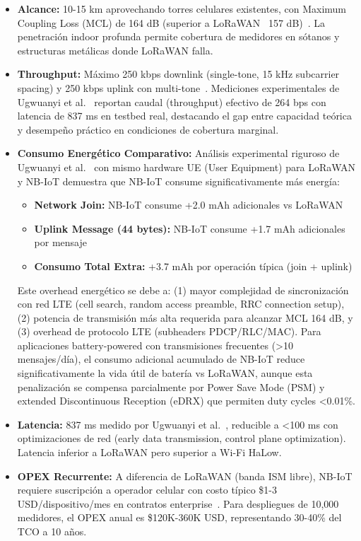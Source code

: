 \begin{itemize}
\item \textbf{Alcance:} 10-15 km aprovechando torres celulares existentes, con Maximum Coupling Loss (MCL) de 164 dB (superior a LoRaWAN ~157 dB)~\cite{ugwuanyiSurveyIoTDeveloping2021}. La penetración indoor profunda permite cobertura de medidores en sótanos y estructuras metálicas donde LoRaWAN falla.

\item \textbf{Throughput:} Máximo 250 kbps downlink (single-tone, 15 kHz subcarrier spacing) y 250 kbps uplink con multi-tone~\cite{chaudhariLPWANTechnologiesEmerging2020}. Mediciones experimentales de Ugwuanyi et al.~\cite{ugwuanyiSurveyIoTDeveloping2021} reportan caudal (throughput) efectivo de 264 bps con latencia de 837 ms en testbed real, destacando el gap entre capacidad teórica y desempeño práctico en condiciones de cobertura marginal.

\item \textbf{Consumo Energético Comparativo:} Análisis experimental riguroso de Ugwuanyi et al.~\cite{ugwuanyiSurveyIoTDeveloping2021} con mismo hardware UE (User Equipment) para LoRaWAN y NB-IoT demuestra que NB-IoT consume significativamente más energía:
\begin{itemize}
    \item \textbf{Network Join:} NB-IoT consume +2.0 mAh adicionales vs LoRaWAN
    \item \textbf{Uplink Message (44 bytes):} NB-IoT consume +1.7 mAh adicionales por mensaje
    \item \textbf{Consumo Total Extra:} +3.7 mAh por operación típica (join + uplink)
\end{itemize}

Este overhead energético se debe a: (1) mayor complejidad de sincronización con red LTE (cell search, random access preamble, RRC connection setup), (2) potencia de transmisión más alta requerida para alcanzar MCL 164 dB, y (3) overhead de protocolo LTE (subheaders PDCP/RLC/MAC). Para aplicaciones battery-powered con transmisiones frecuentes (>10 mensajes/día), el consumo adicional acumulado de NB-IoT reduce significativamente la vida útil de batería vs LoRaWAN, aunque esta penalización se compensa parcialmente por Power Save Mode (PSM) y extended Discontinuous Reception (eDRX) que permiten duty cycles <0.01\%.

\item \textbf{Latencia:} 837 ms medido por Ugwuanyi et al.~\cite{ugwuanyiSurveyIoTDeveloping2021}, reducible a <100 ms con optimizaciones de red (early data transmission, control plane optimization). Latencia inferior a LoRaWAN pero superior a Wi-Fi HaLow.

\item \textbf{OPEX Recurrente:} A diferencia de LoRaWAN (banda ISM libre), NB-IoT requiere suscripción a operador celular con costo típico \$1-3 USD/dispositivo/mes en contratos enterprise~\cite{chaudhariLPWANTechnologiesEmerging2020}. Para despliegues de 10,000 medidores, el OPEX anual es \$120K-360K USD, representando 30-40\% del TCO a 10 años.
\end{itemize}

